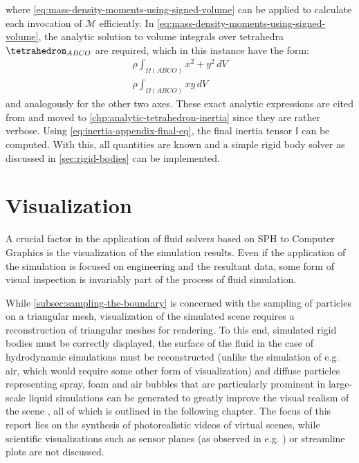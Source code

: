 \documentclass[oneside, a4paper]{book}
\newcommand\br[1]{\left(#1\right)}
\begin{document}
  where \autoref{eq:mass-density-moments-using-signed-volume} can be applied to calculate each invocation of $\mathcal{M}$ efficiently. In \autoref{eq:mass-density-moments-using-signed-volume}, the analytic solution to volume integrals over tetrahedra $\tetrahedron_{ABCO}$ are required, which in this instance have the form:
  \begin{align}
    \rho \int_{\Omega\br{ABCO}} x^2+y^2\, dV\\
    \rho \int_{\Omega\br{ABCO}} xy\, dV
  \end{align}
  and analogously for the other two axes. These exact analytic expressions are cited from \autocite[Tonon]{explicit-exact-tetrahedron-formulas} and moved to \autoref{chp:analytic-tetrahedron-inertia} since they are rather verbose. Using \autoref{eq:inertia-appendix-final-eq}, the final inertia tensor $\mathds{I}$ can be computed. With this, all quantities are known and a simple rigid body solver as discussed in \autoref{sec:rigid-bodies} can be implemented.


\chapter{Visualization}\label{chp:visualization}

  A crucial factor in the application of fluid solvers based on SPH to Computer Graphics is the visualization of the simulation results. Even if the application of the simulation is focused on engineering and the resultant data, some form of visual inspection is invariably part of the process of fluid simulation.
  
  While \autoref{subsec:sampling-the-boundary} is concerned with the sampling of particles on a triangular mesh, visualization of the simulated scene requires a reconstruction of triangular meshes for rendering. To this end, simulated rigid bodies must be correctly displayed, the surface of the fluid in the case of hydrodynamic simulations must be reconstructed (unlike the simulation of e.g. air, which would require some other form of visualization) and diffuse particles representing spray, foam and air bubbles that are particularly prominent in large-scale liquid simulations can be generated to greatly improve the visual realism of the scene \autocite{unified-spray-foam-bubbles}, all of which is outlined in the following chapter. The focus of this report lies on the synthesis of photorealistic videos of virtual scenes, while scientific visualizations such as sensor planes (as observed in e.g. \autocite[this paper]{compressed-neighbour-lists}) or streamline plots are not discussed.
  
\end{document}
